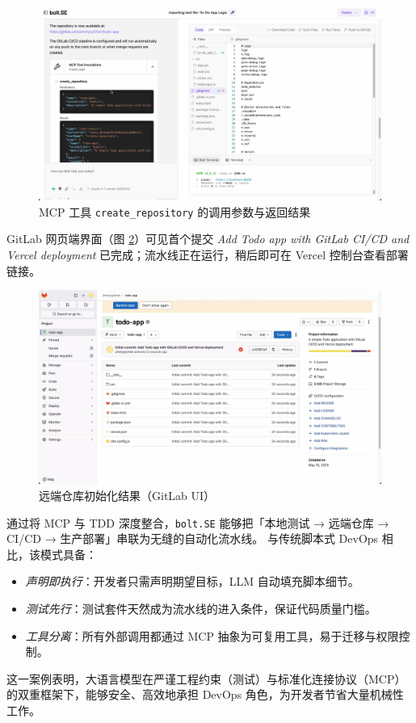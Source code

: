 \begin{figure}[htbp]
  \centering
  \includegraphics[width=.8\textwidth]{figures/screenshots/ci-cd/mcp_invocation.png}
  \caption{MCP 工具 \texttt{create\_repository} 的调用参数与返回结果}
  \label{fig:mcp_invocation}
\end{figure}

GitLab 网页端界面（图 \ref{fig:gitlab_repo}）可见首个提交 \textit{Add Todo app with GitLab CI/CD and Vercel deployment} 已完成；流水线正在运行，稍后即可在 Vercel 控制台查看部署链接。

\begin{figure}[htbp]
  \centering
  \includegraphics[width=.8\textwidth]{figures/screenshots/ci-cd/gitlab_repo.png}
  \caption{远端仓库初始化结果（GitLab UI）}
  \label{fig:gitlab_repo}
\end{figure}

通过将 MCP 与 TDD 深度整合，\texttt{bolt.SE} 能够把「本地测试 → 远端仓库 → CI/CD → 生产部署」串联为无缝的自动化流水线。  
与传统脚本式 DevOps 相比，该模式具备：

\begin{itemize}
  \item \emph{声明即执行}：开发者只需声明期望目标，LLM 自动填充脚本细节。  
  \item \emph{测试先行}：测试套件天然成为流水线的进入条件，保证代码质量门槛。  
  \item \emph{工具分离}：所有外部调用都通过 MCP 抽象为可复用工具，易于迁移与权限控制。  
\end{itemize}

这一案例表明，大语言模型在严谨工程约束（测试）与标准化连接协议（MCP）的双重框架下，能够安全、高效地承担 DevOps 角色，为开发者节省大量机械性工作。